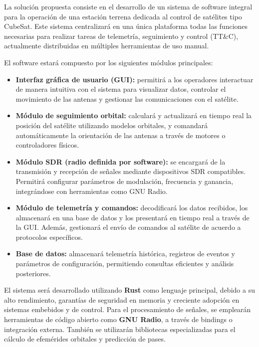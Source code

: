 La solución propuesta consiste en el desarrollo de un sistema de software integral para la operación de una estación terrena dedicada al control de satélites tipo CubeSat. Este sistema centralizará en una única plataforma todas las funciones necesarias para realizar tareas de telemetría, seguimiento y control (TT\&C), actualmente distribuidas en múltiples herramientas de uso manual.

El software estará compuesto por los siguientes módulos principales:

\begin{itemize}
    \item \textbf{Interfaz gráfica de usuario (GUI):} permitirá a los operadores interactuar de manera intuitiva con el sistema para visualizar datos, controlar el movimiento de las antenas y gestionar las comunicaciones con el satélite.
    
    \item \textbf{Módulo de seguimiento orbital:} calculará y actualizará en tiempo real la posición del satélite utilizando modelos orbitales, y comandará automáticamente la orientación de las antenas a través de motores o controladores físicos.
    
    \item \textbf{Módulo SDR (radio definida por software):} se encargará de la transmisión y recepción de señales mediante dispositivos SDR compatibles. Permitirá configurar parámetros de modulación, frecuencia y ganancia, integrándose con herramientas como GNU Radio.
    
    \item \textbf{Módulo de telemetría y comandos:} decodificará los datos recibidos, los almacenará en una base de datos y los presentará en tiempo real a través de la GUI. Además, gestionará el envío de comandos al satélite de acuerdo a protocolos específicos.
    
    \item \textbf{Base de datos:} almacenará telemetría histórica, registros de eventos y parámetros de configuración, permitiendo consultas eficientes y análisis posteriores.
\end{itemize}

El sistema será desarrollado utilizando \textbf{Rust} como lenguaje principal, debido a su alto rendimiento, garantías de seguridad en memoria y creciente adopción en sistemas embebidos y de control. Para el procesamiento de señales, se emplearán herramientas de código abierto como \textbf{GNU Radio}, a través de bindings o integración externa. También se utilizarán bibliotecas especializadas para el cálculo de efemérides orbitales y predicción de pases.

